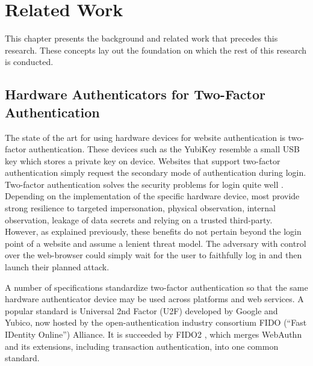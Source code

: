 \chapter{Related Work}\label{Chap:RelatedWork}

This chapter presents the background and related work that precedes this research. These concepts lay out the foundation on which the rest of this research is conducted.

\section{Hardware Authenticators for \newline Two-Factor Authentication}\label{Sec:HardwareAuthenticators_2FA}

The state of the art for using hardware devices for website authentication is two-factor authentication. These devices such as the YubiKey \cite{yubico-products} resemble a small USB key which stores a private key on device. Websites that support two-factor authentication simply request the secondary mode of authentication during login. Two-factor authentication solves the security problems for login quite well \cite{questRemovePasswords}. Depending on the implementation of the specific hardware device, most provide strong resilience to targeted impersonation, physical observation, internal observation, leakage of data secrets and relying on a trusted third-party. However, as explained previously, these benefits do not pertain beyond the login point of a website and assume a lenient threat model. The adversary with control over the web-browser could simply wait for the user to faithfully log in and then launch their planned attack. 


A number of specifications standardize two-factor authentication so that the same hardware authenticator device may be used across platforms and web services. A popular standard is Universal 2nd Factor (U2F) \cite{fido-u2f} developed by Google and Yubico, now hosted by the open-authentication industry consortium FIDO (``Fast IDentity Online'') Alliance. It is succeeded by FIDO2 \cite{fido2}, which merges WebAuthn and its extensions, including transaction authentication, into one common standard.

